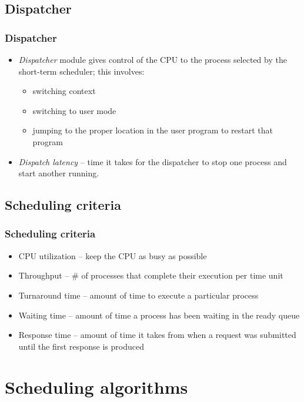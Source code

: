 \documentclass[CJKutf8,xcolor=pdftex,dvipsnames,table]{beamer}
\begin{document}
\begin{CJK*}{UTF8}{song}
  \subsection{Dispatcher}

  \begin{frame}
  \frametitle{Dispatcher} \pause
  \begin{itemize}
  \item{\emph{Dispatcher} module gives control of the CPU to the process selected by the short-term scheduler; this involves:} \pause
    \begin{itemize}
    \item{switching context} \pause
    \item{switching to user mode} \pause
    \item{jumping to the proper location in the user program to restart that program} \pause
    \end{itemize}
  \item{\emph{Dispatch latency} \pause– time it takes for the dispatcher to stop one process and start another running.}
  \end{itemize}
  \end{frame}
  
  \subsection{Scheduling criteria}

  \begin{frame}
  \frametitle{Scheduling criteria} \pause
  \begin{itemize}
  \item{CPU utilization \pause –  keep the CPU as busy as possible} \pause
  \item{Throughput \pause –  \# of processes that complete their execution per time unit} \pause
  \item{Turnaround time \pause –  amount of time to execute a particular process} \pause
  \item{Waiting time \pause –  amount of time a process has been waiting in the ready queue} \pause
  \item{Response time \pause –  amount of time it takes from when a request was submitted until the first response is produced}
  \end{itemize}
  \end{frame}
  
  \section{Scheduling algorithms}


\end{CJK*}
\end{document}
